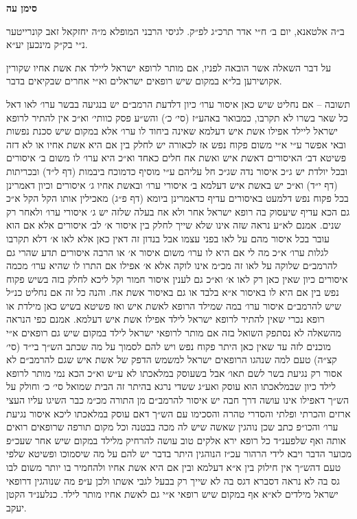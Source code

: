 \documentclass[12pt, openany]{book}
\newcommand{\chapname}{}
\newcommand{\newchap}[1]{
	\addcontentsline{toc}{chapter}{#1}
	\renewcommand{\chapname}{#1}
		\begin{center}
			\textbf{%
\fontsize{16pt}{16pt}\selectfont
				#1}
		\end{center}
}
\begin{document}
\newchap{סימן עה}
\begin{multicols}{2}
ב״ה אלטאנא, יום ב׳ ח״י אדר תרכ״ג לפ״ק. לגיסי הרבני המופלא מ״ה יחזקאל זאב קונרייטער נ״י בק״ק מינכען יע״א.\\\vspace{0pt}

על דבר השאלה אשר הובאה לפניו, אם מותר לרופא ישראל ליילד את אשת אחיו שקורין אקושירען בל״א במקום שיש רופאים ישראלים וא״י אחרים שבקיאים בדבר.\\\vspace{0pt}

תשובה – אם נחליט שיש כאן איסור ערו׳ כיון דלדעת הרמב״ם יש בנגיעה בבשר ערו׳ לאו דאל כל שאר בשרו לא תקרבו, כמבואר באהע״ז (סי׳ כ׳) והש״ע פסק כוותי׳ וא״כ אין להתיר לרופא ישראל ליילד אפילו אשת איש דעלמא שאינה ביחוד לו ערו׳ אלא במקום שיש סכנת נפשות ובאי אפשר ע״י א״י משום פקוח נפש אז לכאורה יש לחלק בין אם היא אשת אחיו או לא דזה פשיטא דב׳ האיסורים דאשת איש ואשת אח חלים כאחד וא״כ היא ערו׳ לו משום ב׳ איסורים ובכל יולדת יש ג״כ איסור נדה שג״כ חל עליהם ע״י מוסיף כדמוכח ביבמות (דף ל״ד) ובכריתות (דף י״ד) וא״כ יש באשת איש דעלמא ב׳ איסורי ערו׳ ובאשת אחיו ג׳ איסורים וכיון דאמרינן בכל פקוח נפש דלמעט באיסורים עדיף כדאמרינן ביומא (דף פ״ג) מאכילין אותו הקל הקל א״כ גם הכא עדיף שיעסוק בה רופא ישראל אחר ולא אח בעלה שלזה יש ג׳ איסורי ערו׳ ולאחר רק שנים. אמנם לא״ע נראה שזה אינו שלא שייך לחלק בין איסור א׳ לב׳ איסורים אלא אם הוא עובר בכל איסור מהם על לאו בפני עצמו אבל בנדון זה דאין כאן אלא לאו א׳ דלא תקרבו לגלות ערו׳ א״כ מה לי אם היא לו ערו׳ משום איסור א׳ או הרבה איסורים תדע שהרי גם להרמב״ם שלוקה על לאו זה מכ״מ אינו לוקה אלא א׳ אפילו אם התרו לו שהיא ערו׳ מכמה איסורים כיון שאין כאן רק לאו א׳ וא״כ גם לענין איסור חמור וקל ליכא לחלק בזה בשיש פקוח נפש בין אם היא לו באיסור א״א בלבד או גם באיסור אשת אח. והנה כל זה אם נחליט כנ״ל שיש להרמב״ם איסור ערו׳ במה שמילד הרופא לאשת איש ואז פשיטא בשיש כאן מילדת או רופא נכרי שאין להתיר לרופא ישראל לילד אפילו אשת איש דעלמא. אמנם כפי הנראה מהשאלה לא נסתפק השואל בזה אם מותר לרופאי ישראל לילד במקום שיש גם רופאים א״י מוכנים לזה עד שאין כאן היתר פקוח נפש ויש להם לסמוך על מה שכתב הש״ך בי״ד (סי׳ קצ״ה) טעם למה שנהגו הרופאים ישראל למשמש הדפק של אשת איש שגם להרמב״ם לא אסור רק נגיעת בשר לשם תאו׳ אבל בשעוסק במלאכתו לא ע״ש וא״כ הכא נמי מותר לרופא לילד כיון שבמלאכתו הוא עוסק ואע״ג ששדי נרגא בהיתר זה הבית שמואל סי׳ כ׳ וחולק על הש״ך דאפילו אינו עושה דרך חבה יש איסור להרמב״ם מן התורה מכ״מ כבר השיגו עליו העצי ארזים והכרתי ופלתי והסדרי טהרה והסכימו עם הש״ך דאם עוסק במלאכתו ליכא איסור נגיעת ערו׳ והכו״פ כתב שכן נוהגין שאשה שיש לה מכה בבטנה וכל מקום תורפה שרופאים רואים אותה ואף שלפענ״ד כל רופא ירא אלקים טוב עושה להרחיק מלילד במקום שיש אחר שעכ״פ מכוער הדבר ויבא לידי הרהור עכ״ז הנוהגין היתר בדבר יש להם על מה שיסמוכו ופשיטא שלפי טעם דהש״ך אין חילוק בין א״א דעלמא ובין אם היא אשת אחיו ולהחמיר בו יותר משום לבו גס בה לא נראה דסברא דגס בה לא שייך רק בבעל לגבי אשתו ולכן ע״פ מה שנוהגין דרופאי ישראל מילדים לא״א אף במקום שיש רופאי א״י גם לאשת אחיו מותר לילד. כנלענ״ד הקטן יעקב.\\\vspace{0pt}

\end{multicols}\newpage
\end{document}
